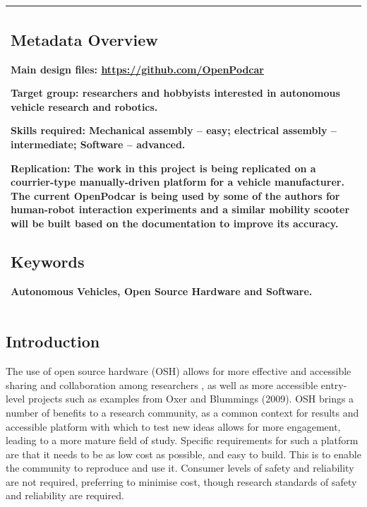 \documentclass[a4paper]{article}
\begin{document}
\begin{longtable}[]{@{}l@{}}
\begin{minipage}[t]{0.97\columnwidth}\raggedright\strut



\subsection{Metadata Overview}\label{h.akaipbqoqfs8}

Main design files: \url{https://github.com/OpenPodcar}

Target group: researchers and hobbyists interested in autonomous vehicle research and robotics. 

Skills required: Mechanical assembly – easy; electrical assembly – intermediate; Software – advanced.

Replication: The work in this project is being replicated on a courrier-type manually-driven platform for a vehicle manufacturer. The current OpenPodcar is being used by some of the authors for human-robot interaction experiments and a similar mobility scooter will be built based on the documentation to improve its accuracy.



\subsection{Keywords}\label{h.kdz351yp7g7c}

{Autonomous Vehicles, Open Source Hardware and Software.}

\strut\end{minipage}\tabularnewline
\bottomrule
\end{longtable}


\subsection{Introduction}\label{h.pnj38xyr5dyy}

The use of open source hardware (OSH) allows for more effective and accessible sharing and collaboration among researchers \cite{fisher2012open}, as well as more accessible entry-level projects such as examples from Oxer and Blummings (2009). OSH brings a number of benefits to a research community, as a common context for results and accessible platform with which to test new ideas allows for more engagement, leading to a more mature field of study. Specific requirements for such a platform are that it needs to be as low cost as possible, and easy to build. This is to enable the community to reproduce and use it. Consumer levels of safety and reliability are not required, preferring to minimise cost, though research standards of safety and reliability are required.
\end{document}
